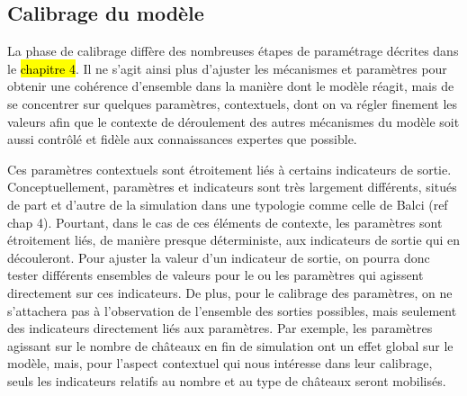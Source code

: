 %
%
%


\subsection{Calibrage du modèle \label{subsec:calibrage}}

La phase de calibrage diffère des nombreuses étapes de paramétrage décrites dans le \hl{chapitre 4}.
Il  ne s'agit ainsi plus d'ajuster les mécanismes et paramètres pour obtenir une cohérence d'ensemble dans la manière dont le modèle réagit, mais de se concentrer sur quelques paramètres, contextuels, dont on va régler finement les valeurs afin que le contexte de déroulement des autres mécanismes du modèle soit aussi contrôlé et fidèle aux connaissances expertes que possible.

Ces paramètres contextuels sont étroitement liés à certains indicateurs de sortie.
Conceptuellement, paramètres et indicateurs sont très largement différents, situés de part et d'autre de la simulation dans une typologie comme celle de Balci (ref chap 4).
Pourtant, dans le cas de ces éléments de contexte, les paramètres sont étroitement liés, de manière presque déterministe, aux indicateurs de sortie qui en découleront.
Pour \og ajuster\fg{} la valeur d'un indicateur de sortie, on pourra donc tester différents ensembles de valeurs pour le ou les paramètres qui agissent directement sur ces indicateurs.
De plus, pour le calibrage des paramètres, on ne s'attachera pas à l'observation de l'ensemble des sorties possibles, mais seulement des indicateurs directement liés aux paramètres.
Par exemple, les paramètres agissant sur le nombre de châteaux en fin de simulation ont un effet global sur le modèle, mais, pour l'aspect contextuel qui nous intéresse dans leur calibrage, seuls les indicateurs relatifs au nombre et au type de châteaux seront mobilisés.

